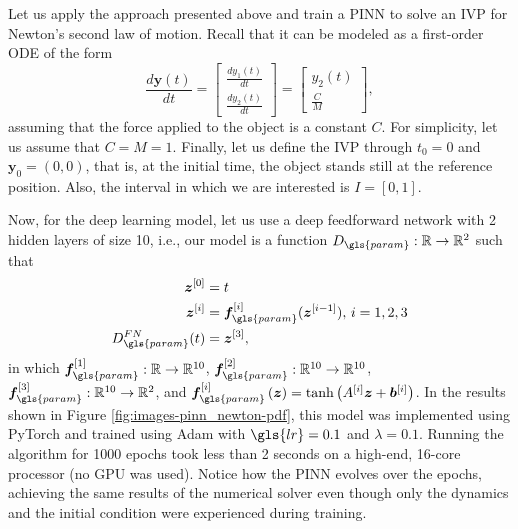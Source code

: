 Let us apply the approach presented above and train a \gls{PINN} to solve an \gls{IVP} for Newton's second law of motion.
Recall that it can be modeled as a first-order \gls{ODE} of the form
\[
    \frac{d \bm{y}(t)}{dt} = \begin{bmatrix} \frac{d y_1(t)}{dt} \\ \frac{d y_2(t)}{dt} \end{bmatrix} = \begin{bmatrix} y_2(t) \\ \frac{C}{M} \end{bmatrix} 
,\]
assuming that the force applied to the object is a constant $C$.
For simplicity, let us assume that $C=M=1$.
Finally, let us define the \gls{IVP} through $t_0=0$ and $\bm{y}_0=\left( 0,0 \right) $, that is, at the initial time, the object stands still at the reference position.
Also, the interval in which we are interested is $I=\left[ 0,1 \right] $.

Now, for the deep learning model, let us use a deep feedforward network with 2 hidden layers of size 10, i.e., our model is a function $D_{\gls{param}}:\R\to \R^2$ such that
\begin{align*}
    \bm{z}^{[0]} &= t \\
    \bm{z}^{[i]} &= \bm{f}_{\gls{param}}^{[i]}(\bm{z}^{[i-1]}),\,i=1,2,3 \\
    D_{\gls{param}}^{FN}(t) &= \bm{z}^{[3]}
,\end{align*}
in which $\bm{f}_{\gls{param}}^{[1]}:\R\to \R^{10}$, $\bm{f}_{\gls{param}}^{[2]}:\R^{10}\to \R^{10}$, $\bm{f}_{\gls{param}}^{[3]}:\R^{10}\to \R^2$, and $\bm{f}_{\gls{param}}^{[i]}\left( \bm{z} \right) =\tanh\left( A^{[i]}\bm{z} + \bm{b}^{[i]} \right) $.
In the results shown in Figure \ref{fig:images-pinn_newton-pdf}, this model was implemented using PyTorch \cite{paszke_pytorch_2019} and trained using Adam with $\gls{lr} = 0.1$ and $\lambda=0.1$.
Running the algorithm for 1000 epochs took less than 2 seconds on a high-end, 16-core processor (no GPU was used).
Notice how the \gls{PINN} evolves over the epochs, achieving the same results of the numerical solver even though only the dynamics and the initial condition were experienced during training.

